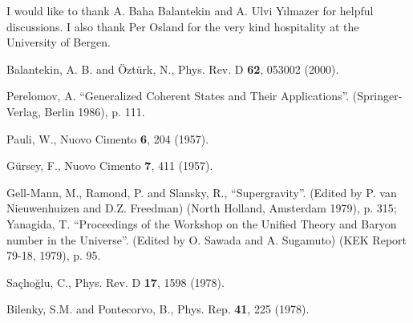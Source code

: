 \documentclass[a4paper,12pt]{article}
\begin{document}
I would like to thank A. Baha Balantekin and A. Ulvi Y{\i}lmazer 
for helpful discussions. I also thank Per Osland for 
the very kind hospitality at the University of Bergen.
\begin{thebibliography}{10}
Balantekin, A. B. and \"{O}zt\"{u}rk, N., Phys. Rev. D {\bf 62}, 053002 
(2000).

Perelomov, A. ``Generalized Coherent States and Their Applications''. 
(Springer-Verlag, Berlin 1986), p. 111.

Pauli, W., Nuovo Cimento {\bf 6}, 204 (1957). 

G\"{u}rsey, F., Nuovo Cimento {\bf 7}, 411 (1957).

Gell-Mann, M., Ramond, P. and Slansky, R., ``Supergravity''. (Edited by 
P. van Nieuwenhuizen and D.Z. Freedman) (North Holland, Amsterdam 1979), 
p. 315; Yanagida, T. ``Proceedings of the Workshop on the Unified Theory and 
Baryon number in the Universe''. (Edited by O. Sawada and A. Sugamuto) 
(KEK Report 79-18, 1979), p. 95.

Sa\c{c}l{\i}o\u{g}lu, C., Phys. Rev. D {\bf 17}, 1598 (1978).

Bilenky, S.M. and Pontecorvo, B., Phys. Rep. {\bf 41}, 225 (1978).
\end{thebibliography}
\end{document}
